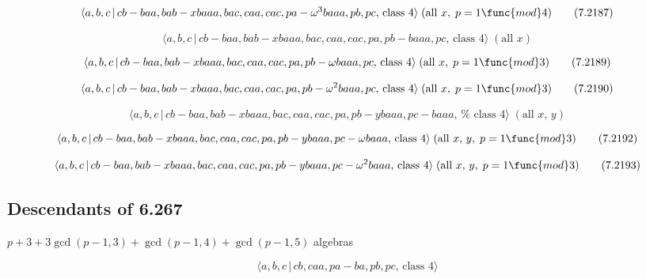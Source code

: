 \documentclass[10pt]{article}
\begin{document}
\begin{equation}
\langle a,b,c\,|\,cb-baa,bab-xbaaa,bac,caa,cac,pa-\omega ^{3}baaa,pb,pc,\,%
\text{class }4\rangle \;(\text{all }x,\;p=1\func{mod}4)  \tag{7.2187}
\end{equation}

\begin{equation}
\langle a,b,c\,|\,cb-baa,bab-xbaaa,bac,caa,cac,pa,pb-baaa,pc,\,\text{class }%
4\rangle \;(\text{all }x)  \tag{7.2188}
\end{equation}

\begin{equation}
\langle a,b,c\,|\,cb-baa,bab-xbaaa,bac,caa,cac,pa,pb-\omega baaa,pc,\,\text{%
class }4\rangle \;(\text{all }x,\;p=1\func{mod}3)  \tag{7.2189}
\end{equation}

\begin{equation}
\langle a,b,c\,|\,cb-baa,bab-xbaaa,bac,caa,cac,pa,pb-\omega ^{2}baaa,pc,\,%
\text{class }4\rangle \;(\text{all }x,\;p=1\func{mod}3)  \tag{7.2190}
\end{equation}

\begin{equation}
\langle a,b,c\,|\,cb-baa,bab-xbaaa,bac,caa,cac,pa,pb-ybaaa,pc-baaa,\,\text{%
class }4\rangle \;(\text{all }x,\,y)  \tag{7.2191}
\end{equation}

\begin{equation}
\langle a,b,c\,|\,cb-baa,bab-xbaaa,bac,caa,cac,pa,pb-ybaaa,pc-\omega baaa,\,%
\text{class }4\rangle \;(\text{all }x,\,y,\;p=1\func{mod}3)  \tag{7.2192}
\end{equation}

\begin{equation}
\langle a,b,c\,|\,cb-baa,bab-xbaaa,bac,caa,cac,pa,pb-ybaaa,pc-\omega
^{2}baaa,\,\text{class }4\rangle \;(\text{all }x,\,y,\;p=1\func{mod}3) 
\tag{7.2193}
\end{equation}

\subsection{Descendants of 6.267}

$p+3+3\gcd (p-1,3)+\gcd (p-1,4)+\gcd (p-1,5)$ algebras

\begin{equation}
\langle a,b,c\,|\,cb,caa,pa-ba,pb,pc,\,\text{class }4\rangle  \tag{7.2194}
\end{equation}
\end{document}
